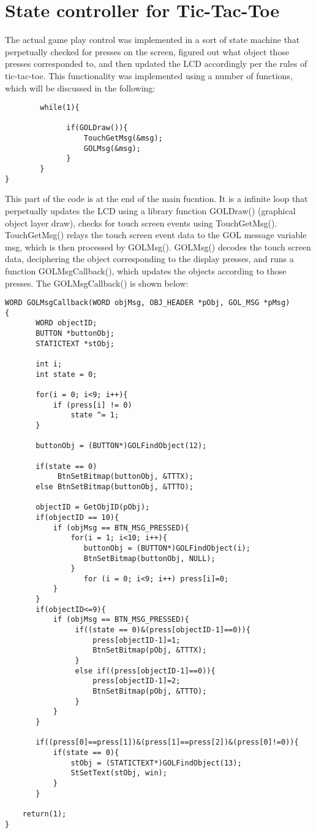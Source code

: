 \documentclass[12pt]{article}
\begin{document}
\section{State controller for Tic-Tac-Toe}
The actual game play control was implemented in a sort of state machine that perpetually checked for presses on the screen, figured out what object those presses corresponded to, and then updated the LCD accordingly per the rules of tic-tac-toe. This functionality was implemented using a number of functions, which will be discussed in the following:
\begin{lstlisting}
        while(1){

              if(GOLDraw()){
                  TouchGetMsg(&msg);
                  GOLMsg(&msg);
              }
        }
}
\end{lstlisting}
This part of the code is at the end of the main fucntion. It is a infinite loop that perpetually updates the LCD using a library function GOLDraw() (graphical object layer draw), checks for touch screen events using TouchGetMsg(). TouchGetMsg() relays the touch screen event data to the GOL message variable msg, which is then processed by GOLMsg(). GOLMsg() decodes the touch screen data, deciphering the object corresponding to the display presses, and runs a function GOLMsgCallback(), which updates the objects according to those presses. The GOLMsgCallback() is shown below:
\begin{lstlisting}
WORD GOLMsgCallback(WORD objMsg, OBJ_HEADER *pObj, GOL_MSG *pMsg)
{
       WORD objectID;
       BUTTON *buttonObj;
       STATICTEXT *stObj;

       int i;
       int state = 0;

       for(i = 0; i<9; i++){
           if (press[i] != 0)
               state ^= 1;
       }
       
       buttonObj = (BUTTON*)GOLFindObject(12);
       
       if(state == 0)
            BtnSetBitmap(buttonObj, &TTTX);
       else BtnSetBitmap(buttonObj, &TTTO);

       objectID = GetObjID(pObj);
       if(objectID == 10){
           if (objMsg == BTN_MSG_PRESSED){
               for(i = 1; i<10; i++){
                  buttonObj = (BUTTON*)GOLFindObject(i);
                  BtnSetBitmap(buttonObj, NULL);
               }
                  for (i = 0; i<9; i++) press[i]=0;
           }
       }
       if(objectID<=9){
           if (objMsg == BTN_MSG_PRESSED){
                if((state == 0)&(press[objectID-1]==0)){
                    press[objectID-1]=1;
                    BtnSetBitmap(pObj, &TTTX);
                }
                else if((press[objectID-1]==0)){
                    press[objectID-1]=2;
                    BtnSetBitmap(pObj, &TTTO);
                }
           }
       }

       if((press[0]==press[1])&(press[1]==press[2])&(press[0]!=0)){
           if(state == 0){
               stObj = (STATICTEXT*)GOLFindObject(13);
               StSetText(stObj, win);
           }
       }
       
	return(1);
}
\end{lstlisting}
\end{document}
